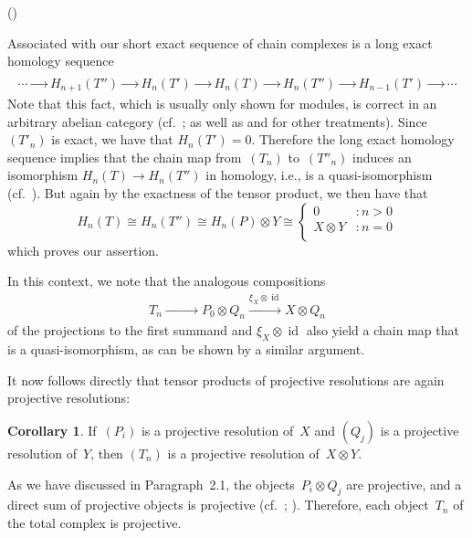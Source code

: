 \documentclass[12pt]{article}
\makeatletter
\newcounter{num}
\newenvironment{pflist}{\begin{list}{(\arabic{num})}{\usecounter{num} \leftmargin0cm \itemindent5pt}}{\end{list}}
\theoremstyle{definition}
\newtheorem{Cor}[Satz]{Corollary}
\theoremstyle{break}
\renewenvironment{proof}[1][\proofname]{\par
\vspace{-5pt}%
\pushQED{\qed}%
\normalfont
\topsep0pt \partopsep0pt %
\trivlist
\item[\hskip\labelsep
\bfseries
#1\@addpunct{.}]\ignorespaces
}{%
\popQED\endtrivlist\@endpefalse
\addvspace{6pt plus 6pt} %
}
\DeclareMathOperator\id{id}
\renewcommand{\1}{\mathbbm{1}}
\newcommand{\ot}{\mathbin{\otimes}}
\makeatother
\begin{document}
\begin{proof}
\begin{pflist}
\item
Associated with our short exact sequence of chain complexes is a long exact homology sequence
\begin{align*}
\cdots \xrightarrow{\phantom{xxx}} H_{n+1}(T'') \xrightarrow{\phantom{xxx}} H_n(T') \xrightarrow{\phantom{xxx}} H_n(T) \xrightarrow{\phantom{xxx}} H_n(T'') \xrightarrow{\phantom{xxx}} H_{n-1}(T')
\xrightarrow{\phantom{xxx}} \cdots
\end{align*}
Note that this fact, which is usually only shown for modules, is correct in an arbitrary abelian category (cf.~\cite[Chap.~VI, \S~8, p.~154]{Mi}; \cite[Chap.~VIII, \S~4, Lem.~5, p.~206ff]{ML2} as well as \cite{Beyl} and \cite{FHH} for other treatments). Since~$(T'_n)$ is exact, we have that $H_n(T') = 0$. Therefore the long exact homology sequence implies that the chain map from~$(T_n)$ to~$(T''_n)$ induces an isomorphism $H_n(T) \rightarrow H_n(T'')$
in homology, i.e., is a quasi-isomorphism (cf.~\cite[Def.~1.1.2, p.~3]{We}). But again by the exactness of the tensor product, we then have that
\[H_n(T) \cong H_n(T'') \cong H_n(P) \ot Y \cong
\begin{cases}
0 &: n > 0 \\
X \ot Y &: n = 0 \\
\end{cases}\]
which proves our assertion.
\qedhere
\end{pflist}
\end{proof}

In this context, we note that the analogous compositions
\begin{align*}
T_n \xrightarrow{\phantom{\xi_X \ot \id}} P_0 \ot Q_n \xrightarrow{\xi_X \ot \id}  X \ot Q_n
\end{align*}
of the projections to the first summand and $\xi_X \ot \id$ also yield a chain map that is a quasi-isomorphism, as can be shown by a similar argument.

It now follows directly that tensor products of projective resolutions are again projective resolutions:
\begin{Cor} \label{TensProj}
If~$(P_i)$ is a projective resolution of~$X$ and $(Q_j)$ is a projective resolution of~$Y$, then $(T_n)$ is a projective resolution of~$X \ot Y$.
\end{Cor}
\begin{proof}
As we have discussed in Paragraph~2.1, the objects~$P_i \ot Q_j$ are projective, and a direct sum of projective objects is projective
(cf.~\cite[Chap.~I, Prop.~4.5, p.~24]{HiS}; \cite[Chap.~II, Prop.~14.3, p.~70]{Mi}). Therefore, each object~$T_n$ of the total complex is projective.
\end{proof}
\end{document}
